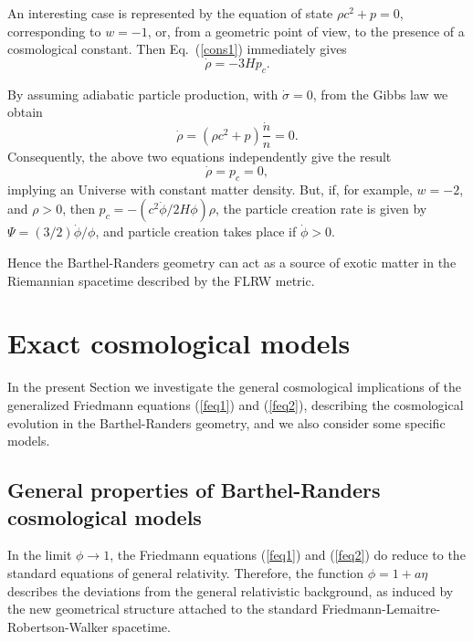 \documentclass[aps,superscriptaddress, showpacs,preprintnumbers, superscriptaddress, nofootinbibt,twocolumn]{revtex4-2}
\begin{document}
 An interesting case is represented by the equation of state $\rho c^2+p=0$, corresponding to $w=-1$, or, from a geometric point of view, to the presence of a cosmological constant. Then Eq.~(\ref{cons1}) immediately gives
 \begin{equation}
  \dot{\rho} = -3H p_c.
\end{equation}

 By assuming adiabatic particle production, with $\dot{\sigma}=0$, from the Gibbs law we obtain
\begin{equation}
\dot{\rho} = (\rho c^2+p)\frac{\dot{n}}{n} = 0.
\end{equation}
 Consequently, the above two equations independently give the result
\begin{equation}
  \dot{\rho} = p_c = 0,
\end{equation}
implying an Universe with constant matter density. But, if, for example, $w=-2$, and $\rho >0$, then $p_c=-\left(c^2\dot{\phi}/2H\phi\right)\rho$,  the particle creation rate is given by $\Psi=(3/2)\dot{\phi}/\phi$, and particle creation takes place if $\dot{\phi}>0$.

Hence the Barthel-Randers geometry can act as a source of exotic matter in the Riemannian spacetime described by the FLRW metric.


\section{Exact cosmological models}\label{sect4}

In the present Section we investigate the general cosmological implications of the generalized Friedmann equations (\ref{feq1}) and (\ref{feq2}), describing the cosmological evolution in the Barthel-Randers geometry, and we also consider some specific models.

\subsection{General properties of Barthel-Randers cosmological models}

In the limit $\phi \rightarrow 1$, the Friedmann equations (\ref{feq1}) and (\ref{feq2}) do reduce to the standard equations of general relativity. Therefore, the function $\phi=1+a\eta $ describes the deviations from the general relativistic background, as induced by the new geometrical structure attached to the standard Friedmann-Lemaitre-Robertson-Walker spacetime.
\end{document}
